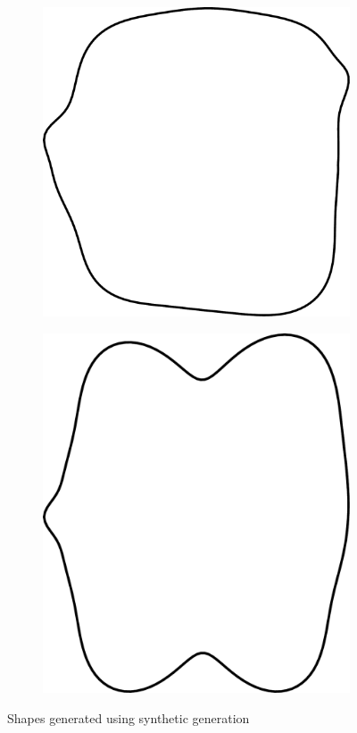 \documentclass[pdftex,12pt,a4paper]{report}
\begin{document}
\begin{figure}[h]
\begin{subfigure}[b]{0.24\textwidth}
	\end{subfigure}
	\begin{subfigure}[b]{0.24\textwidth}
		\centering
		\includegraphics[width=.9\linewidth]{img/synthetic-generation/shapes/3.pdf}
	\end{subfigure}
	\begin{subfigure}[b]{0.24\textwidth}
		\centering
		\includegraphics[width=.9\linewidth]{img/synthetic-generation/shapes/4.pdf}
	\end{subfigure}
	\caption{Shapes generated using synthetic generation}
	\label{fig:synthetic-shapes}
\end{figure}
\end{document}
